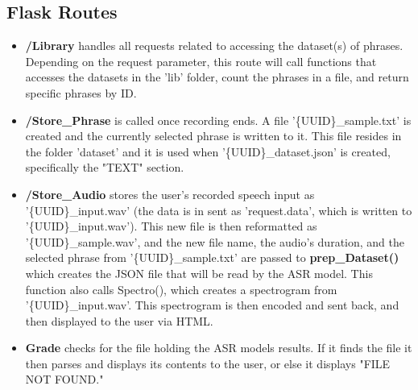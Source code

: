 \documentclass[12pt, letterpaper]{article}
\begin{document}
\subsection*{Flask Routes}
\begin{itemize}
\item{\textbf{/Library}} handles all requests related to accessing the dataset(s) of phrases. Depending on the request parameter, this route will call functions that accesses the datasets in the 'lib' folder, count the phrases in a file, and return specific phrases by ID. 

\item{\textbf{/Store\_Phrase}} is called once recording ends. A file '\{UUID\}\_sample.txt' is created and the currently selected phrase is written to it. This file resides in the folder 'dataset' and it is used when '\{UUID\}\_dataset.json' is created, specifically the "TEXT" section.

\item{\textbf{/Store\_Audio}} stores the user's recorded speech input as '\{UUID\}\_input.wav' (the data is in sent as 'request.data', which is written to '\{UUID\}\_input.wav'). This new file is then reformatted as '\{UUID\}\_sample.wav', and the new file name, the audio's duration, and the selected phrase from '\{UUID\}\_sample.txt' are passed to \textbf{prep\_Dataset()} which creates the JSON file that will be read by the ASR model.
This function also calls Spectro(), which creates a spectrogram from '\{UUID\}\_input.wav'. This spectrogram is then encoded and sent back, and then displayed to the user via HTML.

\item \textbf{Grade} checks for the file holding the ASR models results. If it finds the file it then parses and displays its contents to the user, or else it displays "FILE NOT FOUND."
\end{itemize}
\end{document}
